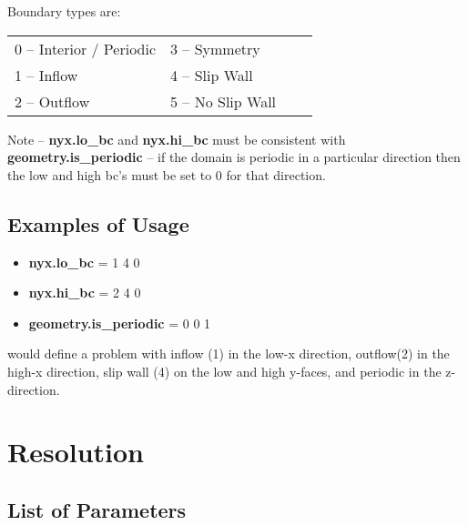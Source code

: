Boundary types are:

\begin{table*}[h]
\begin{center}
\begin{tabular}{llll} 
0 --  Interior / Periodic \hspace{1.in} & 3  --  Symmetry     \hspace{1.in} & \\
1 --  Inflow              \hspace{1.in} & 4  --  Slip Wall    \hspace{1.in}& \\
2 --  Outflow             \hspace{1.in} & 5  --  No Slip Wall \hspace{1.in}& \\
\end{tabular}
\end{center}
\end{table*}

\noindent Note -- {\bf nyx.lo\_bc} and {\bf nyx.hi\_bc} must be consistent with 
{\bf geometry.is\_periodic} -- if the domain is periodic in a particular
direction then the low and high bc's must be set to 0 for that direction.

\subsection{Examples of Usage}

\begin{itemize}

\item {\bf nyx.lo\_bc} = 1 4 0 

\item {\bf nyx.hi\_bc} = 2 4 0 

\item {\bf geometry.is\_periodic} = 0 0 1

\end{itemize}

\noindent would define a problem with inflow (1) in the low-x direction, 
outflow(2) in the high-x direction, slip wall (4) on the low and high y-faces, 
and periodic in the z-direction. 

\section{Resolution}
\subsection{List of Parameters}

